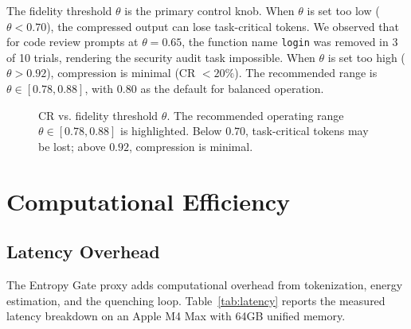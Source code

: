 \documentclass[11pt]{article}
\theoremstyle{remark}
\begin{document}
The fidelity threshold $\theta$ is the primary control knob. When
$\theta$ is set too low ($\theta < 0.70$), the compressed output
can lose task-critical tokens. We observed that for code review prompts
at $\theta = 0.65$, the function name \texttt{login} was removed in 3 of
10 trials, rendering the security audit task impossible. When $\theta$ is
set too high ($\theta > 0.92$), compression is minimal (CR $< 20\%$).
The recommended range is $\theta \in [0.78, 0.88]$, with $0.80$ as the
default for balanced operation.

\begin{figure}[H]
\centering
{}
\caption{CR vs. fidelity threshold $\theta$. The recommended operating range
$\theta \in [0.78, 0.88]$ is highlighted. Below $0.70$, task-critical tokens
may be lost; above $0.92$, compression is minimal.}
\label{fig:theta-sensitivity}
\end{figure}

\section{Computational Efficiency}
\label{sec:efficiency}

\subsection{Latency Overhead}

The Entropy Gate proxy adds computational overhead from tokenization,
energy estimation, and the quenching loop. Table~\ref{tab:latency}
reports the measured latency breakdown on an Apple M4 Max with 64GB
unified memory.
\end{document}
